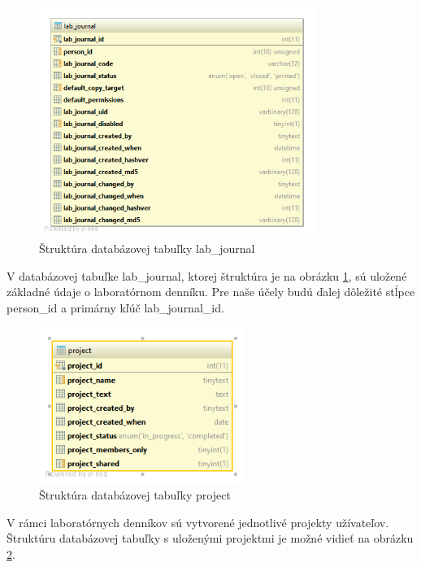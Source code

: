 \documentclass[thesis=M,slovak]{FITthesis}[2013/05/06]
\begin{document}
\begin{figure}\centering
	\includegraphics[width=0.8\textwidth]{Schema_DB_Open_Enventory/lab_journal.png}
 	\caption[Štruktúra databázovej tabuľky lab\_journal]{Štruktúra databázovej tabuľky lab\_journal}\label{graphics:lab_journal}
\end{figure}

V databázovej tabuľke lab\_journal, ktorej štruktúra je na obrázku \ref{graphics:lab_journal}, sú uložené základné údaje o laboratórnom denníku. Pre naše účely budú ďalej dôležité stĺpce person\_id a primárny kľúč lab\_journal\_id.

\begin{figure}\centering
	\includegraphics[width=0.6\textwidth]{Schema_DB_Open_Enventory/project.png}
 	\caption[Štruktúra databázovej tabuľky project]{Štruktúra databázovej tabuľky project}\label{graphics:project}
\end{figure}

V rámci laboratórnych denníkov sú vytvorené jednotlivé projekty užívateľov. Štruktúru databázovej tabuľky s uloženými projektmi je možné vidieť na obrázku \ref{graphics:project}.
\end{document}
